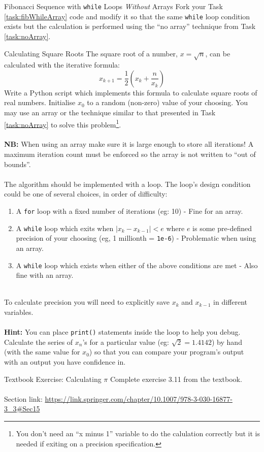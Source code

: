 \documentclass{lab}
\begin{document}
\begin{task}{Fibonacci Sequence with \texttt{while} Loops \textit{Without} Arrays}{}
Fork your Task \ref{task:fibWhileArray} code and modify it so that the same \texttt{while} loop condition exists but the calculation is performed using the ``no array'' technique from Task \ref{task:noArray}.
\end{task}

\pagebreak
\begin{task}{Calculating Square Roots}{}
The square root of a number, $x = \sqrt{n}$, can be calculated with the iterative formula:
\begin{equation}\label{eq:sqrt}
x_{k+1} = \frac{1}{2}\left(x_k + \frac{n}{x_k}\right)
\end{equation}
Write a Python script which implements this formula to calculate square roots of real numbers. Initialise $x_0$ to a random (non-zero) value of your choosing. You may use an array or the technique similar to that presented in Task \ref{task:noArray} to solve this problem\footnote{You don't need an ``x minus 1'' variable to do the calulation correctly but it is needed if exiting on a precision specification.}.
\\ \\
\textbf{NB:} When using an array make sure it is large enough to store all iterations! A maximum iteration count must be enforced so the array is not written to ``out of bounds''.
\\ \\
The algorithm should be implemented with a loop. The loop's design condition could be one of several choices, in order of difficulty:\\
\begin{enumerate}
\item A \texttt{for} loop with a fixed number of iterations (eg: 10) - Fine for an array.
\item A \texttt{while} loop which exits when $\left| x_k - x_{k-1} \right| < e$ where $e$ is some pre-defined precision of your choosing (eg, 1 millionth = \texttt{1e-6}) - Problematic when using an array.
\item A \texttt{while} loop which exists when either of the above conditions are met - Also fine with an array.
\end{enumerate}
~\\
To calculate precision you will need to explicitly save $x_k$ and $x_{k-1}$ in different variables.
\\~\\
\textbf{Hint:} You can place \texttt{print()} statements inside the loop to help you debug. Calculate the series of $x_n$'s for a particular value (eg: $\sqrt{2}=1.4142$) by hand (with the same value for $x_0$) so that you can compare your program's output with an output you have confidence in.
\end{task}\label{tsk:sqrt}

\begin{task}{Textbook Exercise: Calculating $\pi$}{}
Complete exercise 3.11 from the textbook.
\\~\\
Section link: \url{https://link.springer.com/chapter/10.1007/978-3-030-16877-3_3#Sec15}
\end{task}
\end{document}
